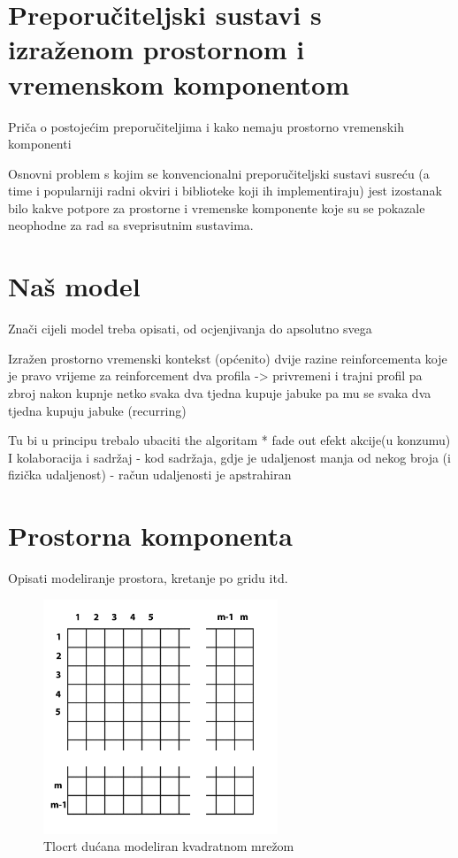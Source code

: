 \documentclass[times, utf8, diplomski, numeric]{fer}
\begin{document}
\section{Preporučiteljski sustavi s izraženom prostornom i vremenskom
komponentom}

Priča o postojećim preporučiteljima i kako nemaju prostorno vremenskih
komponenti 

Osnovni problem s kojim se konvencionalni preporučiteljski sustavi susreću (a
time i popularniji radni okviri i biblioteke koji ih implementiraju) jest
izostanak bilo kakve potpore za prostorne i vremenske komponente koje
su se pokazale neophodne za rad sa sveprisutnim sustavima.

\section{Naš model}
Znači cijeli model treba opisati, od ocjenjivanja do apsolutno svega

Izražen prostorno vremenski kontekst (općenito)
dvije razine reinforcementa
koje je pravo vrijeme za reinforcement
dva profila -> privremeni i trajni profil pa zbroj nakon kupnje
netko svaka dva tjedna kupuje jabuke pa mu se svaka dva tjedna kupuju jabuke
(recurring)


Tu bi u principu trebalo ubaciti the algoritam
* fade out efekt
akcije(u konzumu)
I kolaboracija i sadržaj
- kod sadržaja, gdje je udaljenost manja od nekog broja (i fizička udaljenost)
- račun udaljenosti je apstrahiran

\section{Prostorna komponenta}

Opisati modeliranje prostora, kretanje po gridu itd.

\begin{figure}[htb]
	\centering
	\includegraphics[width=7cm]{images/grid.png}
	\caption{Tlocrt dućana modeliran kvadratnom mrežom}
	\label{fig:StoreGrid}
\end{figure}
\end{document}
